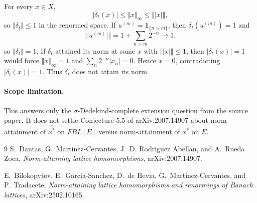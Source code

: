 \documentclass[11pt]{article}
\begin{document}
For every $x\in X$,
\[
  |\delta_t(x)|\leq \Vert x\Vert_\infty\leq \Vert\!\vert x\vert\!\Vert,
\]
so $\Vert\delta_t\Vert\leq 1$ in the renormed space.  If
$u^{(m)}=\mathbf 1_{\{n>m\}}$, then $\delta_t(u^{(m)})=1$ and
\[
  \Vert\!\vert u^{(m)}\vert\!\Vert
  =
  1+\sum_{n>m}2^{-n}\longrightarrow 1,
\]
so $\Vert\delta_t\Vert=1$.  If $\delta_t$ attained its norm at some
$x$ with $\Vert\!\vert x\vert\!\Vert\leq 1$, then $|\delta_t(x)|=1$ would force
$\Vert x\Vert_\infty=1$ and
$\sum_n2^{-n}|x_n|=0$.  Hence $x=0$, contradicting $|\delta_t(x)|=1$.
Thus $\delta_t$ does not attain its norm.

\paragraph{Scope limitation.}
This answers only the $\sigma$-Dedekind-complete extension question from the
source paper.  It does not settle Conjecture 5.5 of arXiv:2007.14907 about
norm-attainment of $\widehat{x^*}$ on $FBL[E]$ versus norm-attainment of
$x^*$ on $E$.

\begin{thebibliography}{9}
S.~Dantas, G.~Martinez-Cervantes, J.~D. Rodriguez Abellan, and A.~Rueda Zoca,
\emph{Norm-attaining lattice homomorphisms}, arXiv:2007.14907.

E.~Bilokopytov, E.~Garcia-Sanchez, D.~de Hevia, G.~Martinez-Cervantes, and
P.~Tradacete,
\emph{Norm-attaining lattice homomorphisms and renormings of Banach lattices},
arXiv:2502.10165.
\end{thebibliography}
\end{document}

